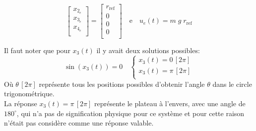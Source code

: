 \documentclass[class=article, crop=false]{standalone}
\begin{document}
\begin{resolution}
\begin{equation}
\begin{bmatrix}
            x_{2_e}\\
            x_{3_e}\\
            x_{4_e}\\
        \end{bmatrix}
        =
        \begin{bmatrix}
            r_{\text{ref}}\\
            0\\
            0\\
            0\\
        \end{bmatrix}
        \quad\text{e}\quad
        u_e(t) = m \; g \; r_{\text{ref}}
    \end{equation}
    \begin{remark}
        Il faut noter que pour $x_3(t)$ il y avait deux solutions possibles:
        \begin{equation*}
            \sin(x_3(t)) = 0 
            \quad
            \begin{cases}
                x_3(t) = 0\,[2\pi]\\
                x_3(t) = \pi\,[2\pi]\\
            \end{cases}
        \end{equation*}
        Où $\theta\,[2\pi]$ représente tous les positions possibles d'obtenir l'angle $\theta$ dans le circle trigonométrique.\\
        
        La réponse $x_3(t) = \pi\,[2\pi]$ représente le plateau à l'envers, avec une angle de $180^{\circ}$, qui n'a pas de signification physique pour ce système et pour cette raison n'était pas considère comme une réponse valable.
    \end{remark}
\end{resolution}

\newpage
\end{document}
